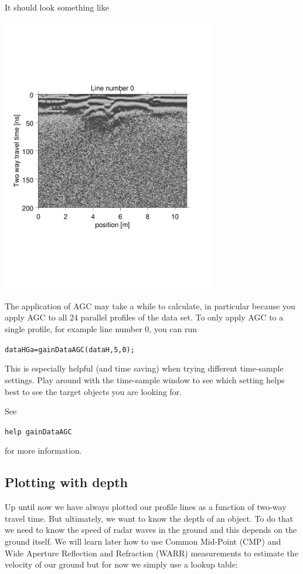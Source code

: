 \documentclass[11pt]{article}
\begin{document}
It should look something like
\begin{center}
\includegraphics[width=0.7\textwidth, trim = 0.9cm 6cm 2cm
  6.5cm,clip]{figures/GPRlineHGa0}
\end{center}

The application of AGC may take a while to calculate, in particular
because you apply AGC to all 24 parallel profiles of the data set. To
only apply AGC to a single profile, for example line number 0, you can
run

\qquad \verb#dataHGa=gainDataAGC(dataH,5,0);#

This is especially helpful (and time saving) when trying different
time-sample settings. Play around with the time-sample window to see which setting helps
best to see the target objects you are looking for.

See

\qquad \verb#help gainDataAGC#

for more information.


\subsection{Plotting with depth}

Up until now we have always plotted our profile lines as a function of
two-way travel time. But ultimately, we want to know the depth of an
object. To do that we need to know the speed of radar waves in the
ground and this depends on the ground itself. We will learn later how
to use Common Mid-Point (CMP) and Wide Aperture Reflection and
Refraction (WARR) measurements to estimate the velocity of our ground
but for now we simply use a lookup table:
  
\end{document}
